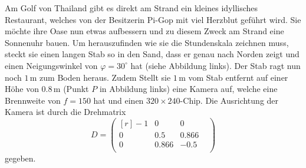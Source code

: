 Am Golf von Thailand gibt es direkt am Strand ein kleines idyllisches 
Restaurant, welches von der Besitzerin Pi-Gop mit viel Herzblut geführt wird. 
Sie möchte ihre Oase nun etwas aufbessern und zu diesem Zweck am Strand eine
Sonnenuhr bauen. Um herauszufinden wie sie die Stundenskala zeichnen muss,
steckt sie einen langen Stab so in den Sand, dass er genau nach Norden zeigt 
und einen Neigungswinkel von $\varphi = 30^\circ$ hat (siehe Abbildung links).
Der Stab ragt nun noch $1\,$m zum Boden heraus. Zudem Stellt sie $1\,$m vom Stab 
entfernt auf einer Höhe von $0.8\,$m (Punkt $P$ in Abbildung links) eine Kamera auf,
welche eine Brennweite von $f=150$ hat und einen $320\times240$-Chip. Die Ausrichtung 
der Kamera ist durch die Drehmatrix
\[
D
=
\begin{pmatrix*}[r]
-1 &   0\phantom{.000} &  0\phantom{.000}\\
 0 &   0.5\phantom{00} &  0.866\\
 0 &   0.866           & -0.5\phantom{00}\\
\end{pmatrix*}
\]
gegeben.

